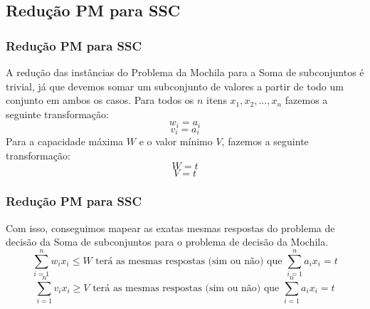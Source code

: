 \documentclass{beamer}
\begin{document}
\subsection{Redução PM para SSC}
\begin{frame}
    \frametitle{Redução PM para SSC}
        A redução das instâncias do Problema da Mochila para a Soma de subconjuntos é trivial, já que devemos somar um subconjunto de valores a partir de todo um conjunto em ambos os casos.
        \newline
        \newline
        Para todos os $n$ itens $x_{1}, x_{2}, ..., x_{n}$ fazemos a seguinte transformação:
        \begin{equation*}
            w_{i} = a_{i}
        \end{equation*}
        \begin{equation*}
            v_{i} = a_{i}
        \end{equation*}
        Para a capacidade máxima $W$ e o valor mínimo $V$, fazemos a seguinte transformação:
        \begin{equation*}
            W = t
        \end{equation*}
        \begin{equation*}
            V = t
        \end{equation*}
        
\end{frame}

\begin{frame}
    \frametitle{Redução PM para SSC}
        Com isso, conseguimos mapear as exatas mesmas respostas do problema de decisão da Soma de subconjuntos para o problema de decisão da Mochila.
         \begin{equation*}
            \sum_{i=1}^{n} w_{i} x_{i} \leq W \mbox{ terá as mesmas respostas (sim ou não) que } \sum_{i=1}^{n} a_{i} x_{i} = t
         \end{equation*}
         \begin{equation*}
            \sum_{i=1}^{n} v_{i} x_{i} \geq V \mbox{ terá as mesmas respostas (sim ou não) que } \sum_{i=1}^{n} a_{i} x_{i} = t
         \end{equation*}
\end{frame}

\end{document}
